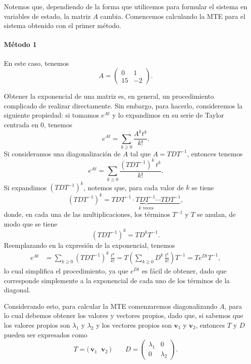 \documentclass[
  11pt,
  letterpaper,
   addpoints,
   answers
  ]{exam}
\begin{document}
\begin{questions}
\begin{solution}
Notemos que, dependiendo de la forma que utilicemos para formular el sistema en variables de
estado, la matriz $A$ cambia. Comencemos calculando la MTE para el sistema obtenido con
el primer método.

\paragraph{Método 1}
En este caso, tenemos
\begin{equation}
A=\begin{pmatrix}
0 & 1\\
15 & -2
\end{pmatrix}.
\end{equation}

Obtener la exponencial de una matriz es, en general, un procedimiento complicado de realizar directamente. Sin embargo, para hacerlo, consideremos la siguiente propiedad: si tomamos $e^{At}$
y lo expandimos en su serie de Taylor centrada en 0, tenemos
\begin{equation}
e^{At}=\sum_{k\ge 0}\frac{A^k t^k}{k!}.
\end{equation}
Si consideramos una diagonalización de $A$ tal que $A=TDT^{-1}$, entonces tenemos
\begin{equation}
e^{At}=\sum_{k\ge 0}\frac{(TDT^{-1})^{k}\,t^k}{k!}.
\end{equation}
Si expandimos $(TDT^{-1})^{k}$, notemos que, para cada valor de $k$ se tiene
\begin{equation}
(TDT^{-1})^{k}=
\underbrace{TDT^{-1}\cdot TDT^{-1}\cdots TDT^{-1}}_{\text{$k$ veces}},
\end{equation}
donde, en cada una de las multiplicaciones, los términos $T^{-1}$ y $T$ se anulan, de modo que se tiene
\begin{equation}
(TDT^{-1})^{k}=TD^{k}T^{-1}.
\end{equation}
Reemplazando en la expresión de la exponencial, tenemos
\begin{equation}
\begin{aligned}
e^{At}&=\sum_{k\ge 0}(TDT^{-1})^{k}\,\frac{t^k}{k!}
= T\left(\sum_{k\ge 0}D^{k}\,\frac{t^k}{k!}\right)T^{-1}
=Te^{Dt}T^{-1},
\end{aligned}
\end{equation}
lo cual simplifica el procedimiento, ya que $e^{Dt}$ es fácil de obtener, dado que corresponde simplemente
a la exponencial de cada uno de los términos de la diagonal.

Considerando esto, para calcular la MTE comenzaremos diagonalizando $A$, para lo cual debemos
obtener los valores y vectores propios, dado que, si sabemos que los valores propios son $\lambda_1$ y $\lambda_2$ y los
vectores propios son $\mathbf{v}_1$ y $\mathbf{v}_2$, entonces $T$ y $D$ pueden ser expresados como
\begin{equation}
T=\big(\,\mathbf{v}_1\;\;\mathbf{v}_2\,\big)
\qquad
D=\begin{pmatrix}
\lambda_1 & 0\\
0 & \lambda_2
\end{pmatrix}.
\end{equation}


\end{solution}
\end{questions}
\end{document}
